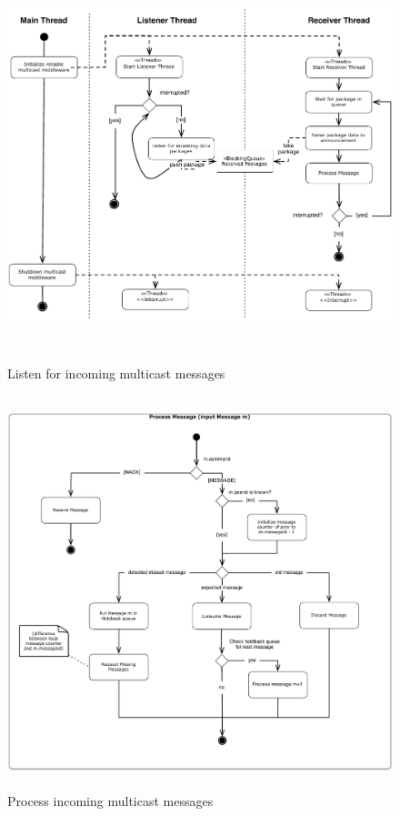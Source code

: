 \begin{figure}[htbp]
    \centering
        \includegraphics[height=4.5in]{figures/receivePackets.pdf}
    \caption{Listen for incoming multicast messages}
    \label{fig:figures_processReceivePackage}
\end{figure}

\begin{figure}[htbp]
    \centering
        \includegraphics[height=4.5in]{figures/processMessages.pdf}
    \caption{Process incoming multicast messages}
    \label{fig:figures_processMessages}
\end{figure}

